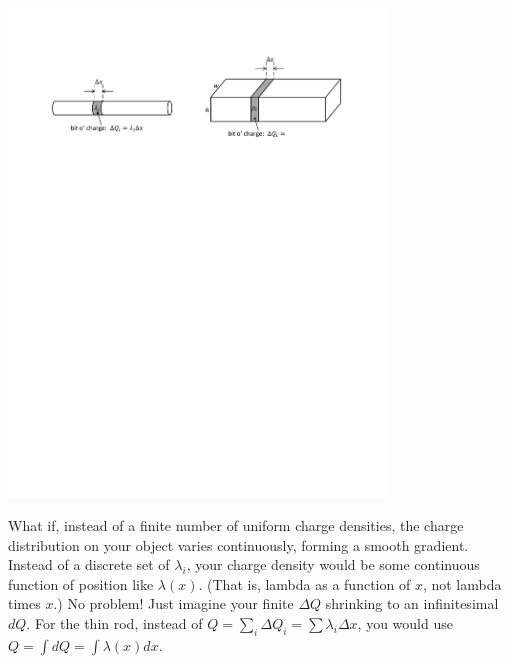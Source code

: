 \begin{enumerate}[labparts]
\vspace{-0.1 in}
\begin{center}
\includegraphics[width=0.75\textwidth]{charge_density/fig2.pdf}
\vspace{-0.1in}
\end{center}
What if, instead of a finite number of uniform charge densities, the charge distribution on your object varies continuously, forming a smooth gradient. Instead of a discrete set of $\lambda_i$, your charge density would be some continuous function of position like $\lambda(x)$.  (That is, lambda as a function of $x$, not lambda times $x$.) No problem! Just imagine your finite $\Delta Q$ shrinking to an infinitesimal $dQ$.  For the thin rod, instead of $Q= \sum_i \Delta Q_i = \sum \lambda_i \Delta x$, you would use $Q = \int dQ = \int\lambda\left(x\right) dx$. 


\end{enumerate}

